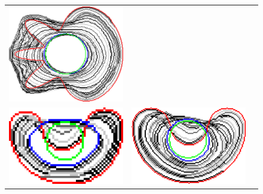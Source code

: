 \begin{figure}[hp!]
\begin{tabular}{ccc}
	\includegraphics[scale=0.25]{figures/chapter5/flow/flower/radius_5/ii/elastica/len_pen_0.01000/jonctions_1/best/gs_0.25000/summary.pdf}\\[2em]	
	
	\includegraphics[scale=0.25]{figures/chapter5/flow/bean/radius_5/ii/elastica/len_pen_0.01000/jonctions_1/best/gs_1.00000/summary.pdf} &	 
	
	\includegraphics[scale=0.25]{figures/chapter5/flow/bean/radius_5/ii/elastica/len_pen_0.01000/jonctions_1/best/gs_0.50000/summary.pdf} &	
	

\end{tabular}
\end{figure}
